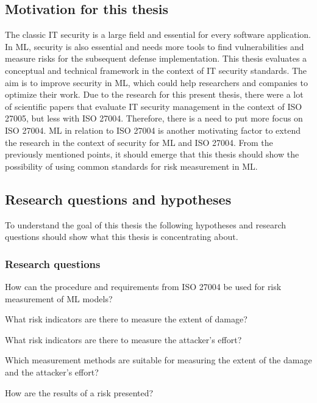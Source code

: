 \subsection{Motivation for this thesis}

The classic IT security is a large field and essential for every software application. In ML, security is also essential and needs more tools to find vulnerabilities and measure risks for
the subsequent defense implementation. This thesis evaluates a conceptual and technical framework in the context of IT security standards. The aim is to improve security in ML, which could
help researchers and companies to optimize their work. Due to the research for this present thesis, there were a lot of scientific papers that evaluate IT security management in the
context of ISO 27005, but less with ISO 27004. Therefore, there is a need to put more focus on ISO 27004. ML in relation to ISO 27004 is another motivating factor to extend the research
in the context of security for ML and ISO 27004. From the previously mentioned points, it should emerge that this thesis should show the possibility of using common standards for risk
measurement in ML.

\subsection{Research questions and hypotheses}


To understand the goal of this thesis the following hypotheses and research questions should show what this thesis is concentrating about.

\subsubsection*{Research questions}

\begin{questions}
  \item How can the procedure and requirements from ISO 27004 be used for risk measurement of ML models? \label{itm:rq1}
  \item What risk indicators are there to measure the extent of damage? \label{itm:rq2}
  \item What risk indicators are there to measure the attacker's effort? \label{itm:rq3}
  \item Which measurement methods are suitable for measuring the extent of the damage and the attacker's effort? \label{itm:rq4}
  \item How are the results of a risk presented? \label{itm:rq5}
\end{questions}

